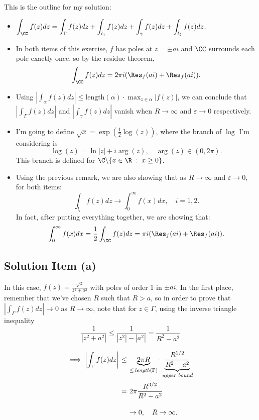 This is the outline for my solution:
\begin{itemize}
    \item $\displaystyle \int_{\CC} f(z) dz = \int_\Gamma f(z) dz + \int_{l_1} f(z) dz + \int_{\gamma} f(z) dz + \int_{l_2}f(z) dz $.
    \item In both items of this exercise, $f$ has poles at $z = \pm ai$ and $\CC$ surrounds each pole exactly once, so by the residue theorem,
    \[ \int_{\CC} f(z) dz = 2\pi i(\Res_f(ai) + \Res_f(ai)). \]
    \item Using $\left| \int_{\alpha} f(z) dz \right| \leq \mbox{length}(\alpha) \cdot \max_{z \in \alpha} |f(z)|$, we can conclude that $\left| \int_{\Gamma} f(z) dz \right|$ and $\left| \int_{\gamma} f(z) dz \right|$ vanish when $R \to \infty$ and $\varepsilon \to 0$ respectively.
    \item I'm going to define $\sqrt{x} = \exp \left( \frac{1}{2}\log(z) \right)$, where the branch of $\log$ I'm considering is
    \[ \log(z) = \ln|z| + i \arg(z),\hspace{1em} \arg(z) \in (0,2 \pi). \]
    This branch is defined for $\C \backslash \{x\in \R \;:\; x \geq 0\}$.
    \item Using the previous remark, we are also showing that as $R \to \infty$ and $\varepsilon \to 0$, for both items:
    \[ \int_{l_i} f(z) dz \to \int_{0}^{\infty} f(x) dx, \hspace{1em} i = 1,2. \]
    In fact, after putting everything together, we are showing that:
    \[ \int_{0}^{\infty} f(x) dx = \frac{1}{2}\int_{\CC} f(z) dz = \pi i(\Res_f(ai) + \Res_f(ai)). \]
\end{itemize}

\subsection*{Solution Item (a)}

In this case, $f(z) = \frac{\sqrt{z}}{z^2 + a^2}$ with poles of order 1 in $\pm ai$. In the first place, remember that we've chosen $R$ such that $R > a$, so in order to prove that $\left| \int_{\Gamma} f(z) dz \right| \to 0$ as $R\to \infty$, note that for $z \in \Gamma$, using the inverse triangle inequality
\[ \frac{1}{|z^2+ a^2|} \leq \frac{1}{|z^2| - |a^2|} = \frac{1}{R^2 - a^2} \]
\[ \everymath{\displaystyle}
\arraycolsep=1.8pt\def\arraystretch{2.5}
\begin{array}{rcl}
    \implies \left| \int_{\Gamma} f(z) dz \right| & \leq & \underbrace{2\pi R}_{\leq\,\textit{length}(\Gamma)} \cdot \underbrace{\frac{R^{1/2}}{R^2 - a^2}}_{\textit{upper bound}}\\
    & = & 2\pi \frac{R^{3/2}}{R^2 - a^2 }\\
    & & \to 0,\hspace{1em} R\to \infty.
\end{array} \]

